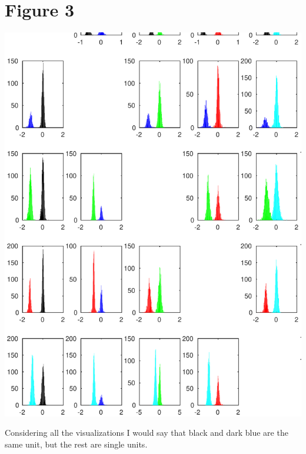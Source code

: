 \documentclass{article}
\begin{document}
\section{Figure 3}
\includegraphics[width=\textwidth]{Figure3.png}

Considering all the visualizations I would say that black and dark blue are the same unit, but the rest are single units. 
\end{document}
